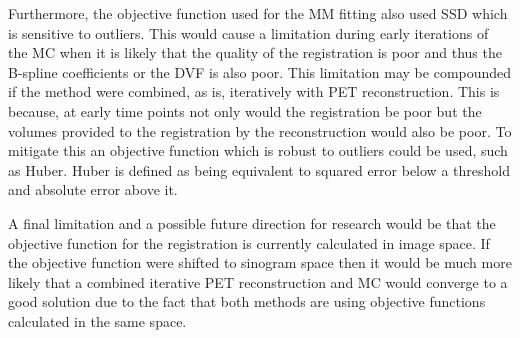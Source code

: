         Furthermore, the objective function used for the \gls{MM} fitting also used \gls{SSD} which is sensitive to outliers. This would cause a limitation during early iterations of the \gls{MC} when it is likely that the quality of the registration is poor and thus the B-spline coefficients or the \gls{DVF} is also poor. This limitation may be compounded if the method were combined, as is, iteratively with \gls{PET} reconstruction. This is because, at early time points not only would the registration be poor but the volumes provided to the registration by the reconstruction would also be poor. To mitigate this an objective function which is robust to outliers could be used, such as Huber. Huber is defined as being equivalent to squared error below a threshold and absolute error above it.
        
        A final limitation and a possible future direction for research would be that the objective function for the registration is currently calculated in image space. If the objective function were shifted to sinogram space then it would be much more likely that a combined iterative \gls{PET} reconstruction and \gls{MC} would converge to a good solution due to the fact that both methods are using objective functions calculated in the same space.
